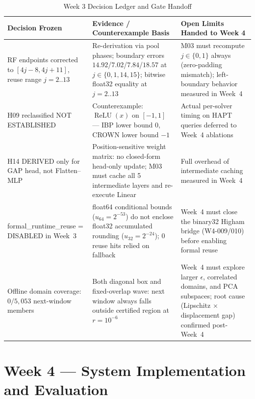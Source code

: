 \documentclass[11pt,oneside,a4paper]{report}
\newcommand{\code}[1]{{\small\upshape\ttfamily #1}}
\newcommand{\relu}{\operatorname{ReLU}}
\theoremstyle{remark}
\begin{document}
\begin{table}[htbp]
\centering\small
\caption{Week 3 Decision Ledger and Gate Handoff}\label{tab:w3_ledger}
\begin{tabularx}{\textwidth}{@{}P{3.6cm}YP{3.8cm}@{}}
\toprule
\textbf{Decision Frozen} & \textbf{Evidence / Counterexample Basis} & \textbf{Open Limits Handed to Week 4} \\
\midrule
RF endpoints corrected to $[4j{-}8,4j{+}11]$, reuse range $j=2..13$ & Re-derivation via pool phases; boundary errors $14.92$/$7.02$/$7.84$/$18.57$ at $j \in \{0,1,14,15\}$; bitwise \code{float32} equality at $j=2..13$ & \code{M03} must recompute $j \in \{0,1\}$ always (zero-padding mismatch); left-boundary behavior measured in Week~4 \\
\addlinespace
\code{H09} reclassified \code{NOT ESTABLISHED} & Counterexample: $\relu(x)$ on $[-1,1]$ --- IBP lower bound $0$, CROWN lower bound $-1$ & Actual per-solver timing on HAPT queries deferred to Week~4 ablations \\
\addlinespace
\code{H14} DERIVED only for GAP head, not Flatten--MLP & Position-sensitive weight matrix: no closed-form head-only update; \code{M03} must cache all 5 intermediate layers and re-execute Linear & Full overhead of intermediate caching measured in Week~4 \\
\addlinespace
\code{formal\_runtime\_reuse = DISABLED} in Week~3 & \code{float64} conditional bounds ($u_{64}=2^{-53}$) do not enclose \code{float32} accumulated rounding ($u_{32}=2^{-24}$); 0 reuse hits relied on fallback & Week~4 must close the \code{binary32} Higham bridge (\code{W4-009/010}) before enabling formal reuse \\
\addlinespace
Offline domain coverage: $0/5{,}053$ next-window members & Both diagonal box and fixed-overlap wave: next window always falls outside certified region at $r=10^{-6}$ & Week~4 must explore larger $\epsilon$, correlated domains, and PCA subspaces; root cause (Lipschitz $\times$ displacement gap) confirmed post-Week~4 \\
\bottomrule
\end{tabularx}
\end{table}
\chapter{Week 4 --- System Implementation and Evaluation}\label{ch:week4}
\end{document}
